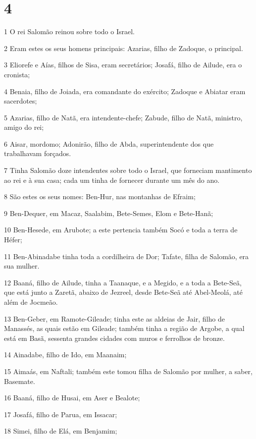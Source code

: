\chapter{4}

\par 1 O rei Salomão reinou sobre todo o Israel.
\par 2 Eram estes os seus homens principais: Azarias, filho de Zadoque, o principal.
\par 3 Eliorefe e Aías, filhos de Sisa, eram secretários; Josafá, filho de Ailude, era o cronista;
\par 4 Benaia, filho de Joiada, era comandante do exército; Zadoque e Abiatar eram sacerdotes;
\par 5 Azarias, filho de Natã, era intendente-chefe; Zabude, filho de Natã, ministro, amigo do rei;
\par 6 Aisar, mordomo; Adonirão, filho de Abda, superintendente dos que trabalhavam forçados.
\par 7 Tinha Salomão doze intendentes sobre todo o Israel, que forneciam mantimento ao rei e à sua casa; cada um tinha de fornecer durante um mês do ano.
\par 8 São estes os seus nomes: Ben-Hur, nas montanhas de Efraim;
\par 9 Ben-Dequer, em Macaz, Saalabim, Bete-Semes, Elom e Bete-Hanã;
\par 10 Ben-Hesede, em Arubote; a este pertencia também Socó e toda a terra de Héfer;
\par 11 Ben-Abinadabe tinha toda a cordilheira de Dor; Tafate, filha de Salomão, era sua mulher.
\par 12 Baaná, filho de Ailude, tinha a Taanaque, e a Megido, e a toda a Bete-Seã, que está junto a Zaretã, abaixo de Jezreel, desde Bete-Seã até Abel-Meolá, até além de Jocmeão.
\par 13 Ben-Geber, em Ramote-Gileade; tinha este as aldeias de Jair, filho de Manassés, as quais estão em Gileade; também tinha a região de Argobe, a qual está em Basã, sessenta grandes cidades com muros e ferrolhos de bronze.
\par 14 Ainadabe, filho de Ido, em Maanaim;
\par 15 Aimaás, em Naftali; também este tomou filha de Salomão por mulher, a saber, Basemate.
\par 16 Baaná, filho de Husai, em Aser e Bealote;
\par 17 Josafá, filho de Parua, em Issacar;
\par 18 Simei, filho de Elá, em Benjamim;
